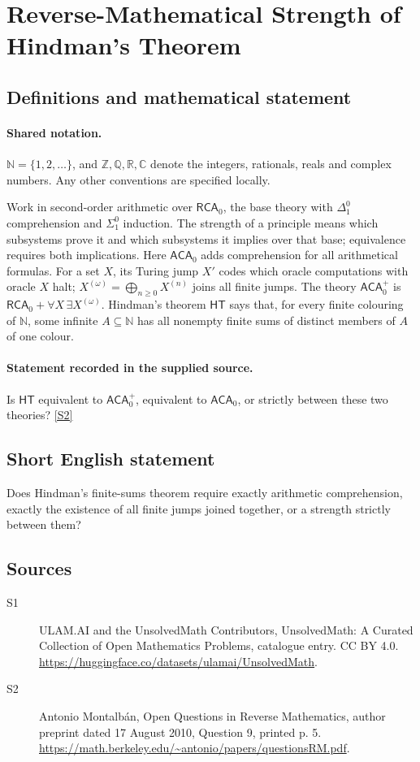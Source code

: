 \documentclass[11pt]{article}
\newcommand{\sref}[2]{\hyperlink{source:#1:#2}{[S#2]}}
\begin{document}
\section{Reverse-Mathematical Strength of Hindman's Theorem}\label{statement}

\subsection{Definitions and mathematical statement}

\paragraph{Shared notation.}$\mathbb N=\{1,2,\ldots\}$, and $\mathbb Z,\mathbb Q,\mathbb R,\mathbb C$ denote the integers, rationals, reals and complex numbers. Any other conventions are specified locally.


Work in second-order arithmetic over $\mathsf{RCA}_0$, the base theory with $\Delta^0_1$ comprehension and $\Sigma^0_1$ induction. The strength of a principle means which subsystems prove it and which subsystems it implies over that base; equivalence requires both implications.  Here $\mathsf{ACA}_0$ adds comprehension for all arithmetical formulas. For a set $X$, its Turing jump $X'$ codes which oracle computations with oracle $X$ halt; $X^{(\omega)}=\bigoplus_{n\geq0}X^{(n)}$ joins all finite jumps. The theory $\mathsf{ACA}_0^+$ is $\mathsf{RCA}_0+\forall X\,\exists X^{(\omega)}$. Hindman’s theorem $\mathsf{HT}$ says that, for every finite colouring of $\mathbb N$, some infinite $A\subseteq\mathbb N$ has all nonempty finite sums of distinct members of $A$ of one colour.
\paragraph{Statement recorded in the supplied source.}
Is $\mathsf{HT}$ equivalent to $\mathsf{ACA}_0^+$, equivalent to $\mathsf{ACA}_0$, or strictly between these two theories? \sref{statement}{2}
\subsection{Short English statement}
Does Hindman’s finite-sums theorem require exactly arithmetic comprehension, exactly the existence of all finite jumps joined together, or a strength strictly between them?
\subsection{Sources}
\begin{description}
\item[\hypertarget{source:statement:1}{S1}] ULAM.AI and the UnsolvedMath Contributors, UnsolvedMath: A Curated Collection of Open Mathematics Problems, catalogue entry. CC BY 4.0. \url{https://huggingface.co/datasets/ulamai/UnsolvedMath}.
\item[\hypertarget{source:statement:2}{S2}] Antonio Montalbán, Open Questions in Reverse Mathematics, author preprint dated 17 August 2010, Question 9, printed p. 5. \url{https://math.berkeley.edu/~antonio/papers/questionsRM.pdf}.
\end{description}
\label{end:statement}
\end{document}
